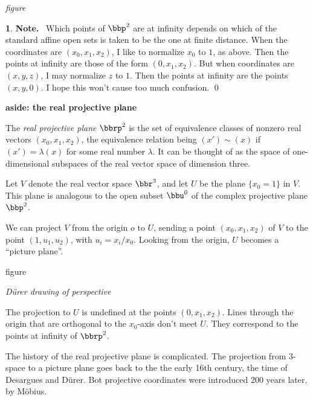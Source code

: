 \documentclass[leqno]{book}
\newcommand\Marginnote[1]{\marginnote{\hspace{-12pt}\normalfont{#1}}}
\renewcommand\theequation{\thesection.\arabic{equation}}
\newenvironment{boldequation}{\renewcommand\theequation{\textbf{\thesection.\arabic{equation}}}\equation}
   {\endequation}
\theoremstyle{definition}%
\numberwithin{equation}{section}
\newtheorem{note}[equation]{}
\theoremstyle{theorem} %
\begin{document}
\bs\centerline{\it figure}
\bs


\msno \begin{note}{\bf Note.} \Marginnote{pointatinfinity}\;\, Which
  points of $\bbp^2$ are at infinity depends on which of the standard
  affine open sets is taken to be the one at finite distance.  When
  the coordinates are $(x_0,x_1,x_2)$, I like to normalize $x_0$ to
  $1$, as above.  Then the points at infinity are those of the form
  $(0,x_1,x_2)$.  But when coordinates are $(x,y,z)$, I may
  normalize $z$ to $1$.  Then the points at infinity are the points
  $(x,y,0)$.  I hope this won't cause too much confusion. \qed
\label{pointatinfinity}\end{note}


\begin{boldequation}
\hspace{-8.0cm} \textbf{aside: the real projective plane}
\label{realprojplane}
 \Marginnote{realprojplane}
 \end{boldequation}

The {\it real projective plane} $\bbrp^2$ is the set of equivalence
classes of nonzero real vectors $(x_0,x_1,x_2)$, the equivalence
relation being $(x') \sim (x)$ if $(x') = \lambda (x)$ for some real
number $\lambda$.  It can be thought of as the space of
one-dimensional subspaces of the real vector space of dimension three.


Let $V$ denote the real vector space $\bbr^3$, and let $U$ be
the plane $\{x_0=1\}$ in $V$.  This plane is analogous to the open subset $\bbu^0$ of the complex
projective plane $\bbp^2$. 

We can project $V$ from the origin $o$ to $U$, sending a point
$(x_0,x_1,x_2)$ of $V$ to the point $(1,u_1,u_2)$, with $u_i=x_i/x_0$.
Looking
from the origin, $U$ becomes a ``picture plane''.

\ms
\centerline{figure}

\msno


\ms
\centerline{\it D\"urer drawing of perspective}

\no The projection to $U$ is undefined at the points $(0,x_1,x_2)$.
Lines through the origin that are orthogonal to the $x_0$-axis don't
meet $U$. They correspond to the points at infinity of $\bbrp^2$.



\ms The history of the real projective plane is complicated.  The
projection from $3$-space to a picture plane goes back to the the early
16th century, the time of Desargues and D\"urer.  Bot projective
coordinates were introduced 200 years later, by M\"obius.
\end{document}
